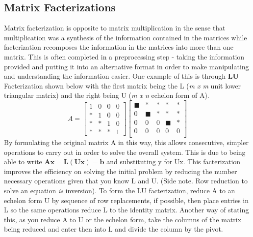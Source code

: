 \documentclass[12pt]{article}
\begin{document}
\subsection{Matrix Facterizations}
Matrix facterization is opposite to matrix multiplication in the sense that multiplication was a synthesis of the information contained in the matrices while %
facterization recomposes the information in the matrices into more than one matrix. This is often completed in a preprocessing step - taking the information %
provided and putting it into an alternative format in order to make manipulating and understanding the information easier. One example of this is through %
\textbf{LU} Facterization shown below with the first matrix being the L (\textit{m x m} unit lower triangular matrix) and the right being U (\textit{m x n} echelon %
form of A). %
\newline
$$
A=\begin{bmatrix}
    1 & 0 & 0 & 0 \\
    * & 1 & 0 & 0 \\
    * & * & 1 & 0 \\
    * & * & * & 1
\end{bmatrix}\begin{bmatrix}
    \scriptstyle \blacksquare & * & * & * & * \\
    0 & \scriptstyle \blacksquare & * & * & * \\
    0 & 0 & 0 & \scriptstyle \blacksquare & * \\
    0 & 0 & 0 & 0 & 0 \\
\end{bmatrix}
$$
\newline
\newline
\newline
By formulating the original matrix A in this way, this allows consecutive, simpler operations to carry out in order to solve the overall system. This is due to %
being able to write $\mathbf{Ax=L(Ux)=b}$ and substituting y for Ux. This facterization improves the efficiency on solving the initial problem by reducing the number %
necessary operations given that you know L and U. (Side note. Row reduction to solve an equation \textit{is} inversion). To form the LU facterization, reduce A to %
an echelon form U by sequence of row replacements, if possible, then place entries in L so the same operations reduce L to the identity matrix. Another way of stating %
this, as you reduce A to U or the echelon form, take the columns of the matrix being reduced and enter then into L and divide the column by the pivot. 
\end{document}
